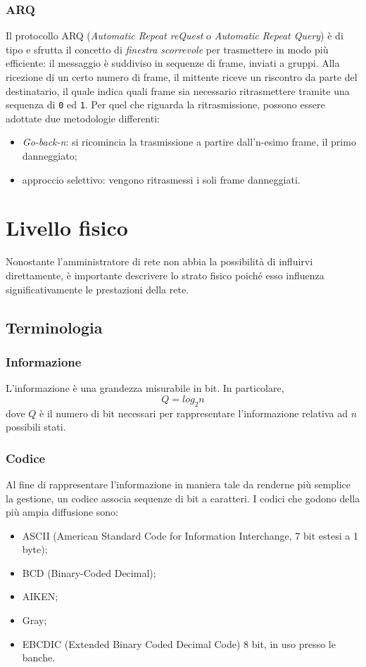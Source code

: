 \documentclass[a4paper, twoside]{article}
\def\code#1{\texttt{#1}}
\def\sec#1{\section{#1}\label{#1}}
\def\subsub#1{\subsubsection{#1}\label{#1}}
\def\vedi#1{\nameref{#1}}
\begin{document}
\subsub{ARQ}
Il protocollo ARQ (\textit{Automatic Repeat reQuest} o \textit{Automatic Repeat Query}) è di tipo \vedi{Full-Duplex} e sfrutta il concetto di \textit{finestra scorrevole} per trasmettere in modo più efficiente: il messaggio è suddiviso in sequenze di frame, inviati a gruppi. Alla ricezione di un certo numero di frame, il mittente riceve un riscontro da parte del destinatario, il quale indica quali frame sia necessario ritrasmettere tramite una sequenza di \code{0} ed \code{1}. Per quel che riguarda la ritrasmissione, possono essere adottate due metodologie differenti:
\begin{itemize}
\item \textit{Go-back-n}: si ricomincia la trasmissione a partire dall'n-esimo frame, il primo danneggiato;
\item approccio selettivo: vengono ritrasmessi i soli frame danneggiati.
\end{itemize}
\newpage\sec{Livello fisico}
Nonostante l'amministratore di rete non abbia la possibilità di influirvi direttamente, è importante descrivere lo strato fisico poiché esso influenza significativamente le prestazioni della rete.

\subsection{Terminologia}
\subsub{Informazione} 
L'informazione è una grandezza misurabile in bit. In particolare, \[Q=log_{2}n\] dove $Q$ è il numero di bit necessari per rappresentare l'informazione relativa ad $n$ possibili stati.

\subsub{Codice}
Al fine di rappresentare l'informazione in maniera tale da renderne più semplice la gestione, un codice associa sequenze di bit a caratteri. I codici che godono della più ampia diffusione sono:
\begin{itemize}
\item ASCII (American Standard Code for Information Interchange, 7 bit estesi a 1 byte);
\item BCD (Binary-Coded Decimal);
\item AIKEN;
\item Gray;
\item EBCDIC (Extended Binary Coded Decimal Code) 8 bit, in uso presso le banche.
\end{itemize}
\end{document}
